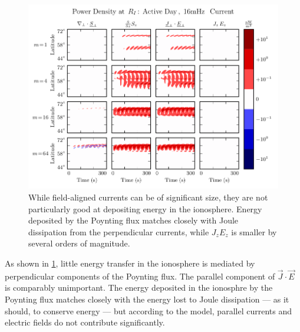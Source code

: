 \begin{figure}[!htb]
    \centering
    \includegraphics[width=\textwidth]{figures/power_density.pdf}
    \caption[Power Density at the Ionosphere]{
      While field-aligned currents can be of significant size, they are not particularly good at depositing energy in the ionosphere. Energy deposited by the Poynting flux matches closely with Joule dissipation from the perpendicular currents, while $J_z E_z$ is smaller by several orders of magnitude. 
    }
    \label{fig_power_density}
\end{figure}

As shown in \cref{fig_power_density}, little energy transfer in the ionosphere is mediated by perpendicular components of the Poynting flux. The parallel component of $\vec{J} \cdot \vec{E}$ is comparably unimportant. The energy deposited in the ionosphre by the Poynting flux matches closely with the energy lost to Joule dissipation --- as it should, to conserve energy --- but according to the model, parallel currents and electric fields do not contribute significantly. 



